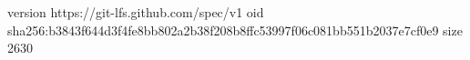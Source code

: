 version https://git-lfs.github.com/spec/v1
oid sha256:b3843f644d3f4fe8bb802a2b38f208b8ffc53997f06c081bb551b2037e7cf0e9
size 2630
